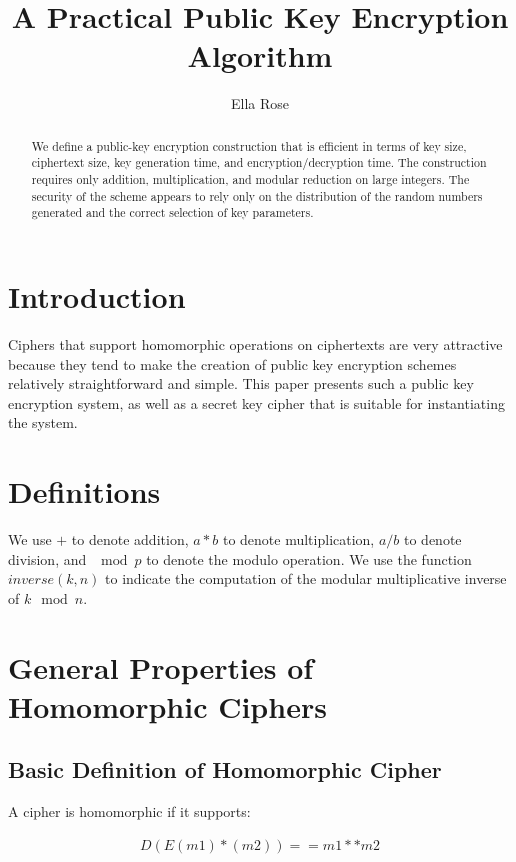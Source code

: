 \documentclass[preprint]{iacrtrans}
\author{Ella Rose}
\institute{Paso Robles, CA \email{python_pride@protonmail.com}}
\title[A Practical Public Key Encryption Algorithm]{A Practical Public Key Encryption Algorithm}
\begin{document}
\maketitle


\begin{abstract}
 We define a public-key encryption construction that is efficient in terms of key size, ciphertext size, key generation time, and encryption/decryption time. The construction requires only addition, multiplication, and modular reduction on large integers. The security of the scheme appears to rely only on the distribution of the random numbers generated and the correct selection of key parameters.
 \end{abstract}

\todototoc
\listoftodos


\section{Introduction}
 Ciphers that support homomorphic operations on ciphertexts are very attractive because they tend to make the creation of public key encryption schemes relatively straightforward and simple. This paper presents such a public key encryption system, as well as a secret key cipher that is suitable for instantiating the system.

\section{Definitions}
We use $+$ to denote addition, $a * b$ to denote multiplication, $a / b$ to denote division, and $\mod p$ to denote the modulo operation. We use the function $inverse(k, n)$ to indicate the computation of the modular multiplicative inverse of $k \mod n$.

\section{General Properties of Homomorphic Ciphers}
\subsection{Basic Definition of Homomorphic Cipher}
A cipher is homomorphic if it supports:

\begin{align}
 D(E(m1) * (m2)) == m1 ** m2
\end{align}
\end{document}
